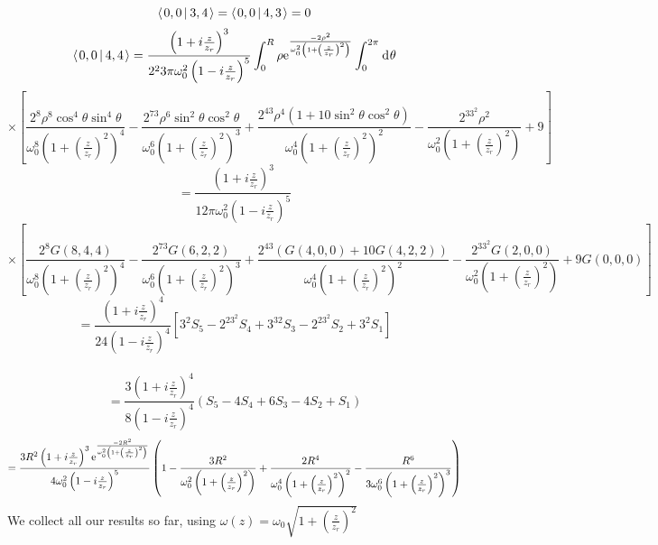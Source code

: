 \documentclass[11pt]{amsart}
\makeatletter
\newcommand{\e}{{\rm e}}				%
\newcommand{\msp}[1]{\mspace{#1mu}}		%
\newcommand{\0}{\varnothing}		%
\newcommand{\dd}{\msp{1} {\rm{d}} \msp{1}}	%
\newcommand{\brac}[2]{\left\langle\msp{2} #1\left\lvert \msp{3.5} #2 \right.\right\rangle}	%
\newcommand{\1}{!}
\newcommand{\2}{@}
\newcommand{\3}{\#}
\newcommand{\4}{\$}
\newcommand{\5}{\%}
\newcommand{\6}{$^\wedge$}
\newcommand{\7}{\&}
\newcommand{\8}{*}
\newcommand{\9}{(}
\makeatother
\begin{document}
\[
\brac{0,0}{3,4} = \brac{0,0}{4,3} = 0
\]
\[
\brac{0,0}{4,4} = \frac{\left(1+i\frac{z}{z_r}\right)^3}{2^23\pi\omega_0^2\left(1-i\frac{z}{z_r}\right)^5}\int_0^R\rho \e^{\frac{-2\rho^2}{\omega_0^2\left(1+\left(\frac{z}{z_r}\right)^2\right)}}\int_0^{2\pi}\dd \theta
\]
\[
\times \left[\frac{2^8\rho^8\cos^4\theta\sin^4\theta}{\omega_0^8\left(1+\left(\frac{z}{z_r}\right)^2\right)^4} - \frac{2^73\rho^6\sin^2\theta\cos^2\theta}{\omega_0^6\left(1+\left(\frac{z}{z_r}\right)^2\right)^3}+\frac{2^43\rho^4\left(1+10\sin^2\theta\cos^2\theta\right)}{\omega_0^4\left(1+\left(\frac{z}{z_r}\right)^2\right)^2}-\frac{2^33^2\rho^2}{\omega_0^2\left(1+\left(\frac{z}{z_r}\right)^2\right)}+9\right]
\]
\[
=\frac{\left(1+i\frac{z}{z_r}\right)^3}{12\pi\omega_0^2\left(1-i\frac{z}{z_r}\right)^5}\]\[\times\left[\frac{2^8G(8,4,4)}{\omega_0^8\left(1+\left(\frac{z}{z_r}\right)^2\right)^4}-\frac{2^73G(6,2,2)}{\omega_0^6\left(1+\left(\frac{z}{z_r}\right)^2\right)^3}+\frac{2^43\left(G(4,0,0)+10G(4,2,2)\right)}{\omega_0^4\left(1+\left(\frac{z}{z_r}\right)^2\right)^2}-\frac{2^33^2G(2,0,0)}{\omega_0^2\left(1+\left(\frac{z}{z_r}\right)^2\right)}+9G(0,0,0)\right]
\]
\[
=\frac{\left(1+i\frac{z}{z_r}\right)^4}{24\left(1-i\frac{z}{z_r}\right)^4}\left[3^2S_5-2^23^2S_4+3^32S_3-2^23^2S_2+3^2S_1\right]
\]
\\[-.58cm]\[
=\frac{3\left(1+i\frac{z}{z_r}\right)^4}{8\left(1-i\frac{z}{z_r}\right)^4}\left(S_5-4S_4+6S_3-4S_2+S_1\right)
\]
\[
=\frac{3R^2\left(1+i\frac{z}{z_r}\right)^3\e^{\frac{-2R^2}{\omega_0^2\left(1+\left(\frac{z}{z_r}\right)^2\right)}}}{4\omega_0^2\left(1-i\frac{z}{z_r}\right)^5}\left(1-\frac{3R^2}{\omega_0^2\left(1+\left(\frac{z}{z_r}\right)^2\right)}+\frac{2R^4}{\omega_0^4\left(1+\left(\frac{z}{z_r}\right)^2\right)^2}-\frac{R^6}{3\omega_0^6\left(1+\left(\frac{z}{z_r}\right)^2\right)^3}\right)
\]
We collect all our results so far, using $\omega(z) = \omega_0\sqrt{1+\left(\frac{z}{z_r}\right)^2}$
\end{document}
